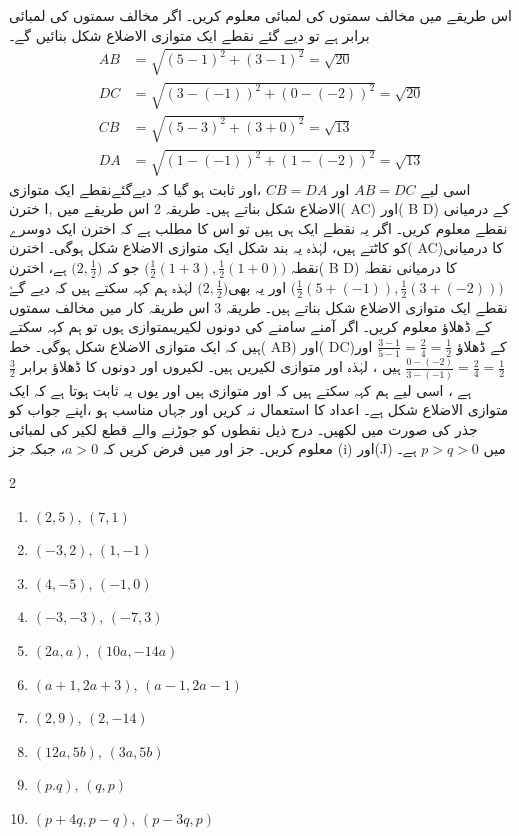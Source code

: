  اس طریقے میں مخالف سمتوں کی لمبائی معلوم کریں۔ اگر مخالف سمتوں کی لمبائی برابر ہے تو دیے گئے نقطے ایک متوازی الاضلاع شکل بنائیں گے۔
\begin{align*}
AB &= \sqrt{(5 -1)^2 + (3 -1)^2} = \sqrt{20} \\ DC &= \sqrt{(3-(-1))^2 + (0-(-2))^2} = \sqrt{20} \\ CB &= \sqrt{(5 -3)^{2} + (3+0)^{2}} = \sqrt{13} \\ DA &= \sqrt{(1-(-1))^2 + (1-(-2))^2} = \sqrt{13} 
\end{align*}
اسی لیے \( AB = DC \)  اور   \( CB = DA \) ،اور ثابت ہو گیا کہ دیےگئےنقطے ایک متوازی الاضلاع شکل بناتے ہیں۔
طریقہ 2 
اس طریقے میں ,ا خترن(     AC) اور(     B D) کے درمیانی نقطے معلوم کریں۔ اگر یہ نقطے ایک ہی ہیں تو اس کا مطلب ہے کہ اخترن ایک دوسرے کو کاٹتے ہیں،  لہٰذہ یہ بند شکل ایک متوازی الاضلاع شکل ہوگی۔
اخترن(   AC)کا درمیانی نقطہ \( \big( \frac{1}{2}(1+3),\frac{1}{2}(1+0)\big)  \) جو کہ \(  \big( 2, \frac{1}{2}\big)\) ہے، اخترن(    B D) کا  درمیانی نقطہ \(    \big( \frac{1}{2}(5+(-1)) , \frac{1}{2}(3+(-2))     \big) \) اور یہ بھی\(  \big( 2, \frac{1}{2}\big)\) لہٰذہ ہم کہہ سکتے ہیں کہ دیے گۓ نقطے ایک متوازی الاضلاع شکل بناتے ہیں۔
طریقہ 3 
اس طریقہ کار میں مخالف سمتوں کے ڈھلاؤ معلوم کریں۔ اگر آمنے سامنے کی دونوں لکیریںمتوازی ہوں تو ہم کہہ سکتے ہیں کہ    ایک متوازی الاضلاع شکل ہوگی۔ خط( AB) اور(  DC)کے ڈھلاؤ \(  \frac{3-1}{5-1}=\frac{2}{4}=\frac{1}{2} \) اور \( \frac{0-(-2)}{3-(-1)}=\frac{2}{4}=\frac{1}{2}  \)  ہیں ، لہٰذہ   اور  متوازی لکیریں ہیں۔ لکیروں      اور      دونوں کا ڈھلاؤ  برابر  \(  \frac{3}{2}\)  ہے ، اسی لیے ہم کہہ سکتے ہیں کہ     اور     متوازی ہیں اور یوں یہ ثابت ہوتا ہے کہ    ایک متوازی الاضلاع شکل ہے۔
اعداد کا استعمال نہ کریں اور جہاں مناسب ہو ،اپنے جواب کو جذر کی صورت میں لکھیں۔
درج ذیل نقطوں کو جوڑنے والے قطع لکیر کی لمبائی معلوم کریں۔  جز    اور  میں فرض کریں کہ    \(a> 0\)، جبکہ  جز    (i)    اور(J) میں      \( p>q > 0   \)   ہے۔
\begin{multicols}{2}
\begin{enumerate}[.a]
\item \( (2,5), \,  (7,1)  \) 
\item \( (-3,2), \,  (1,-1) \)
\item \( (4,-5), \,  (-1,0) \)
\item \( (-3,-3), \,  (-7,3) \)
\item \( (2a,a), \,  (10a, -14a) \)
\item \( (a+1, 2a+3), \,  (a-1, 2a-1) \)
\item \( (2,9), \,  (2,-14) \)
\item \( (12a,5b), \,  (3a,5b) \)
\item \( (p.q), \,  (q,p) \) 
\item \( (p+4q, p-q), \,  (p-3q,p) \)
\end{enumerate}
\end{multicols}
